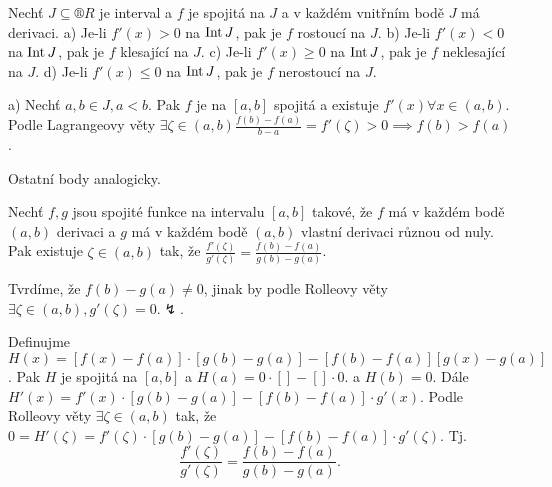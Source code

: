 \documentclass[12pt]{article}					%
\begin{document}
        \begin{veta}
            Nechť $J \subseteq ®R$ je interval a $f$ je spojitá na $J$ a v každém vnitřním bodě $J$ má derivaci. a) Je-li $f'(x) > 0$ na $\operatorname{Int} J$, pak je $f$ rostoucí na $J$. b) Je-li $f'(x) < 0$ na $\operatorname{Int} J$, pak je $f$ klesající na $J$. c) Je-li $f'(x) ≥ 0$ na $\operatorname{Int} J$, pak je $f$ neklesající na $J$. d) Je-li $f'(x) ≤ 0$ na $\operatorname{Int} J$, pak je $f$ nerostoucí na $J$.
            
            \begin{dukazin}
                a) Nechť $a, b \in J, a < b$. Pak $f$ je na $[a, b]$ spojitá a existuje $f'(x) \forall x \in (a, b)$. Podle Lagrangeovy věty $\exists \zeta \in (a, b) \frac{f(b) - f(a)}{b - a} = f'(\zeta) > 0 \implies f(b) > f(a)$.

                Ostatní body analogicky.
            \end{dukazin}
        \end{veta}


        \begin{veta}
            Nechť $f, g$ jsou spojité funkce na intervalu $[a, b]$ takové, že $f$ má v každém bodě $(a, b)$ derivaci a $g$ má v každém bodě $(a, b)$ vlastní derivaci různou od nuly. Pak existuje $\zeta \in (a, b)$ tak, že $\frac{f'(\zeta)}{g'(\zeta)} = \frac{f(b) - f(a)}{g(b) - g(a)}$.

            \begin{dukazin}
                Tvrdíme, že $f(b) - g(a) ≠ 0$, jinak by podle Rolleovy věty $\exists \zeta \in (a, b), g'(\zeta) = 0. \lightning$.

                Definujme $H(x) = [f(x) - f(a)]·[g(b) - g(a)] - [f(b) - f(a)][g(x) - g(a)]$. Pak $H$ je spojitá na $[a, b]$ a $H(a) = 0·[] - []·0$. a $H(b) = 0$. Dále $H'(x) = f'(x)·[g(b) - g(a)] - [f(b) - f(a)]·g'(x)$. Podle Rolleovy věty $\exists \zeta \in (a, b)$ tak, že $0 = H'(\zeta) = f'(\zeta)·[g(b) - g(a)] - [f(b) - f(a)]·g'(\zeta)$. Tj.
                $$ \frac{f'(\zeta)}{g'(\zeta)} = \frac{f(b) - f(a)}{g(b) - g(a)}. $$ 
            \end{dukazin}
        \end{veta}
\end{document}
